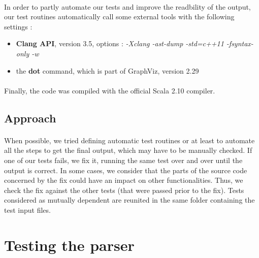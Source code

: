 \documentclass{report}
\begin{document}
\paragraph{}
\hspace{4mm}\textnormal{In order to partly automate our tests and improve the readbility of the output, our test routines automatically call some external tools with the following settings :}

\vspace{3mm}
\begin{itemize}
\item \textbf{Clang API}, version 3.5, options : \textit{-Xclang -ast-dump -std=c++11 -fsyntax-only -w}\vspace{1mm}
\item the \textbf{dot} command, which is part of GraphViz, version 2.29\vspace{1mm}
\end{itemize}

\paragraph{}
\hspace{4mm}\textnormal{Finally, the code was compiled with the official Scala 2.10 compiler.}

\subsection{Approach}

\paragraph{}
\hspace{4mm}\textnormal{When possible, we tried defining automatic test routines or at least to automate all the steps to get the final output, which may have to be manually checked.
If one of our tests fails, we fix it, running the same test over and over until the output is correct.
In some cases, we consider that the parts of the source code concerned by the fix could have an impact on other functionalities. Thus, we check the fix against the other
tests (that were passed prior to the fix). Tests considered as mutually dependent are reunited in the same folder containing the test input files.}

\section{Testing the parser}
\end{document}
